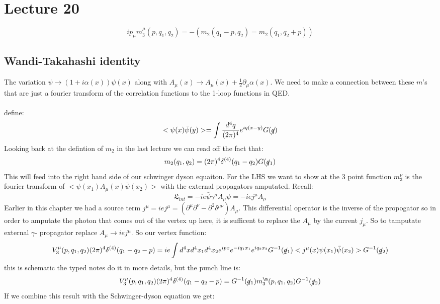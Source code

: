 \documentclass{article}
\begin{document}
        \section{Lecture 20}
        $$
         i p_{\mu} m_3^{\mu} ( p ,q_1, q_2) = - ( m_2( q_1 - p, q_2) = m_2( q_1, q_2 + p))
        $$
        \subsection{Wandi-Takahashi identity}
        The variation $\psi \rightarrow ( 1 + i \alpha(x)) \psi(x)$ along with $A_{\mu} (x) \rightarrow A_{\mu} (x) + \frac{1}{2} \partial_{\mu} \alpha(x)$. We need to make a connection between these $m$'s that are just a fourier transform of the correlation functions to the 1-loop functions in QED. \\\\
        define:
        $$
         < \psi(x) \bar \psi(y) > = \int \frac{d^4 q}{(2\pi)^4} e^{i q ( x-y) } G( \cancel q)
        $$
        Looking back at the defintion of $m_2$ in the last lecture we can read off the fact that:
        $$
         m_2 (q_1, q_2) = (2\pi)^4 \delta^{(4)} ( q_1 - q_2) G( \cancel q_1)
        $$
        This will feed into the right hand side of our schwinger dyson equaiton. For the LHS we want to show at the 3 point function $m_3^{\nu}$ is the fourier transform of $< \psi(x_1) A_{\mu}(x) \bar \psi(x_2)> $ with the external propagators amputated. Recall:
        $$
         \mathfrak{L}_{int} =-ie\bar \psi \gamma^{\mu} A_{\mu} \psi = - ie j^{\mu} A_{\mu} 
        $$
        Earlier in this chapter we had a source term $j^{\mu} = ie j^{\mu} = ( \partial^{\mu} \partial^{\nu} - \partial^2 \delta^{\mu \nu} ) A_{\mu}$. This differential operator is the inverse of the propogator so in order to amputate the photon that comes out of the vertex up here, it is sufficent to replace the $A_{\mu}$ by the current $j_{\mu}$. So to tamputate external $\gamma$- propagator replace $A_{\mu} \rightarrow ie j^{\mu}$. So our vertex function:
        $$
        V_3^{\mu} ( p, q_1, q_2)  (2\pi)^4 \delta^{(4)} ( q_1 - q_2 - p) = ie \int d^4 x d^4 x_1 d^4 x_2 e^{i p x} e^{-iq_1 x_1} e^{i q_2 x_2} G^{-1}( \cancel q_1) < j^{\mu}(x) \psi(x_1) \bar \psi(x_2) > G^{-1} ( \cancel q_2)
        $$
        this is schematic the typed notes do it in more details, but the punch line is:
        $$
         V_3^{\mu} ( p, q_1, q_2) (2 \pi)^4 \delta^{(4)} (q_1 - q_2 - p) = G^{-1} ( \cancel q_1) m_3^{\m} ( p, q_1, q_2) G^{-1}(\cancel q_2)
        $$
If we combine this result with the Schwinger-dyson equation we get:
\end{document}
